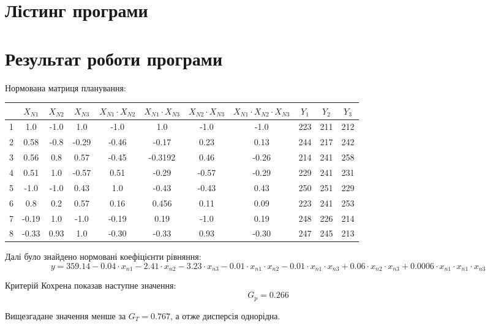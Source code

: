 \section{Лістинг програми}



\newpage

\section{Результат роботи програми}

Нормована матриця планування:
\begin{center}
    \begin{tabular}{|c|c|c|c|c|c|c|c|c|c|c|}
        \hline
         & $X_{N1}$ & $X_{N2}$ & $X_{N3}$ & $X_{N1}\cdot X_{N2}$ & $X_{N1}\cdot X_{N3}$ & $X_{N2}\cdot X_{N3}$ &$X_{N1}\cdot X_{N2}\cdot X_{N3}$ & $Y_{1}$ & $Y_{2}$ & $Y_{3}$ \\ 
        \hline
        1& 1.0 & -1.0 & 1.0 & -1.0 & 1.0 & -1.0 & -1.0 & 223 & 211 & 212\\
        2& 0.58 & -0.8 & -0.29 & -0.46 & -0.17 & 0.23 & 0.13 & 244 & 217 & 242\\
        3& 0.56 & 0.8 & 0.57 & -0.45 & -0.3192 & 0.46 & -0.26 & 214 & 241 & 258\\
        4& 0.51 & 1.0 & -0.57 & 0.51 & -0.29 & -0.57 & -0.29 & 229 & 241 & 231\\
        5& -1.0 & -1.0 & 0.43 & 1.0 & -0.43 & -0.43 & 0.43 & 250 & 251 & 229\\
        6& 0.8 & 0.2 & 0.57 & 0.16 & 0.456& 0.11 & 0.09 & 223 & 241 & 253\\
        7& -0.19 & 1.0 & -1.0 & -0.19 & 0.19 & -1.0 & 0.19 & 248 & 226 & 214\\
        8& -0.33 & 0.93 & 1.0 & -0.30 & -0.33 & 0.93 & -0.30 & 247 & 245 & 213\\
        \hline
    \end{tabular}
\end{center}

Далі було знайдено нормовані коефіцієнти рівняння:
\[y = 359.14-0.04\cdot x_{n1}-2.41\cdot x_{n2}-3.23\cdot x_{n3}-0.01\cdot x_{n1}\cdot x_{n2}-0.01\cdot x_{n1}\cdot x_{n3}+0.06\cdot x_{n2}\cdot x_{n3}+0.0006\cdot x_{n1}\cdot x_{n1}\cdot x_{n3}\]

Критерій Кохрена показав наступне значення:
\[G_p = 0.266\]

Вищезгадане значення менше за $G_T=0.767$, а отже дисперсія однорідна.

